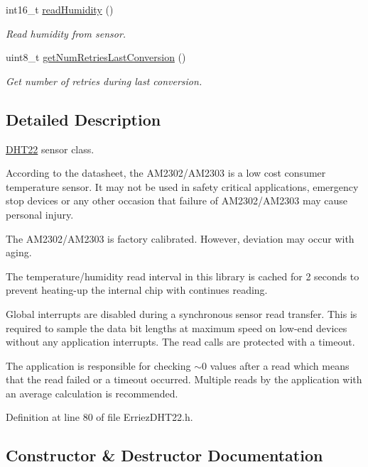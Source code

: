 \begin{DoxyCompactItemize}
int16\+\_\+t \hyperlink{class_d_h_t22_a4ff2d9fac4b8ecf1d72f71bb861c8dcf}{read\+Humidity} ()
\begin{DoxyCompactList}\small\item\em Read humidity from sensor. \end{DoxyCompactList}\item 
uint8\+\_\+t \hyperlink{class_d_h_t22_a2a6202258c0705df3499b65a74a85067}{get\+Num\+Retries\+Last\+Conversion} ()
\begin{DoxyCompactList}\small\item\em Get number of retries during last conversion. \end{DoxyCompactList}\end{DoxyCompactItemize}


\subsection{Detailed Description}
\hyperlink{class_d_h_t22}{D\+H\+T22} sensor class. 

According to the datasheet, the A\+M2302/\+A\+M2303 is a low cost consumer temperature sensor. It may not be used in safety critical applications, emergency stop devices or any other occasion that failure of A\+M2302/\+A\+M2303 may cause personal injury.

The A\+M2302/\+A\+M2303 is factory calibrated. However, deviation may occur with aging.

The temperature/humidity read interval in this library is cached for 2 seconds to prevent heating-\/up the internal chip with continues reading.

Global interrupts are disabled during a synchronous sensor read transfer. This is required to sample the data bit lengths at maximum speed on low-\/end devices without any application interrupts. The read calls are protected with a timeout.

The application is responsible for checking $\sim$0 values after a read which means that the read failed or a timeout occurred. Multiple reads by the application with an average calculation is recommended. 

Definition at line 80 of file Erriez\+D\+H\+T22.\+h.



\subsection{Constructor \& Destructor Documentation}
